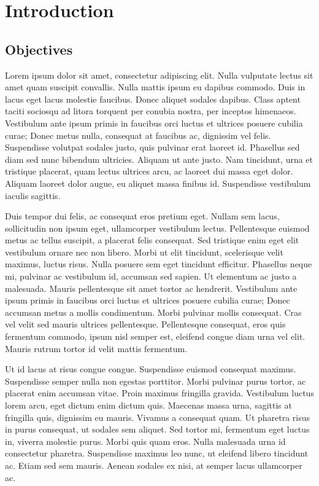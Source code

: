 \chapter{Introduction}
\section{Objectives}
Lorem ipsum dolor sit amet, consectetur adipiscing elit. Nulla vulputate lectus sit amet quam suscipit convallis. Nulla mattis ipsum eu dapibus commodo. Duis in lacus eget lacus molestie faucibus. Donec aliquet sodales dapibus. Class aptent taciti sociosqu ad litora torquent per conubia nostra, per inceptos himenaeos. Vestibulum ante ipsum primis in faucibus orci luctus et ultrices posuere cubilia curae; Donec metus nulla, consequat at faucibus ac, dignissim vel felis. Suspendisse volutpat sodales justo, quis pulvinar erat laoreet id. Phasellus sed diam sed nunc bibendum ultricies. Aliquam ut ante justo. Nam tincidunt, urna et tristique placerat, quam lectus ultrices arcu, ac laoreet dui massa eget dolor. Aliquam laoreet dolor augue, eu aliquet massa finibus id. Suspendisse vestibulum iaculis sagittis.

Duis tempor dui felis, ac consequat eros pretium eget. Nullam sem lacus, sollicitudin non ipsum eget, ullamcorper vestibulum lectus. Pellentesque euismod metus ac tellus suscipit, a placerat felis consequat. Sed tristique enim eget elit vestibulum ornare nec non libero. Morbi ut elit tincidunt, scelerisque velit maximus, luctus risus. Nulla posuere sem eget tincidunt efficitur. Phasellus neque mi, pulvinar ac vestibulum id, accumsan sed sapien. Ut elementum ac justo a malesuada. Mauris pellentesque sit amet tortor ac hendrerit. Vestibulum ante ipsum primis in faucibus orci luctus et ultrices posuere cubilia curae; Donec accumsan metus a mollis condimentum. Morbi pulvinar mollis consequat. Cras vel velit sed mauris ultrices pellentesque. Pellentesque consequat, eros quis fermentum commodo, ipsum nisl semper est, eleifend congue diam urna vel elit. Mauris rutrum tortor id velit mattis fermentum.

Ut id lacus at risus congue congue. Suspendisse euismod consequat maximus. Suspendisse semper nulla non egestas porttitor. Morbi pulvinar purus tortor, ac placerat enim accumsan vitae. Proin maximus fringilla gravida. Vestibulum luctus lorem arcu, eget dictum enim dictum quis. Maecenas massa urna, sagittis at fringilla quis, dignissim eu mauris. Vivamus a consequat quam. Ut pharetra risus in purus consequat, ut sodales sem aliquet. Sed tortor mi, fermentum eget luctus in, viverra molestie purus. Morbi quis quam eros. Nulla malesuada urna id consectetur pharetra. Suspendisse maximus leo nunc, ut eleifend libero tincidunt ac. Etiam sed sem mauris. Aenean sodales ex nisi, at semper lacus ullamcorper ac.

